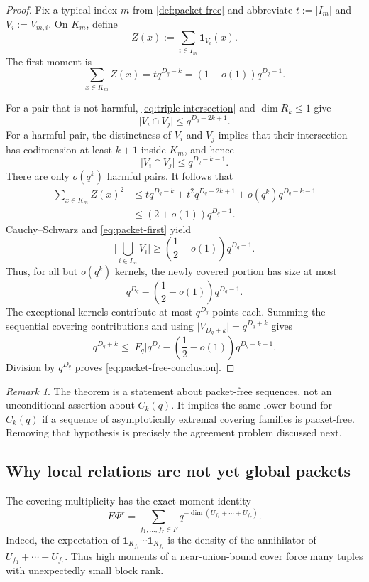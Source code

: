 \documentclass[11pt,reqno]{amsart}
\numberwithin{equation}{section}
\theoremstyle{definition}
\theoremstyle{remark}
\newtheorem{remark}[remark]{Remark}
\newcommand{\E}{\mathbb E}
\newcommand{\one}{\mathbf 1}
\newcommand{\cF}{\mathcal F}
\newcommand{\cR}{\mathcal R}
\newcommand{\abs}[1]{\lvert#1\rvert}
\def\mathbb#1{#1}%
\def\mathcal#1{#1}%
\begin{document}
\begin{proof}
Fix a typical index $m$ from \cref{def:packet-free} and abbreviate
$t:=\abs{I_m}$ and $V_i:=V_{m,i}$.  On $K_m$, define
\[
 Z(x):=\sum_{i\in I_m}\one_{V_i}(x).
\]
The first moment is
\begin{equation}\label{eq:packet-first}
 \sum_{x\in K_m}Z(x)
 =tq^{D_q-k}
 =(1-o(1))q^{D_q-1}.
\end{equation}

For a pair that is not harmful, \eqref{eq:triple-intersection} and
$\dim\cR_k\le1$ give
\[
 \abs{V_i\cap V_j}
 \le q^{D_q-2k+1}.
\]
For a harmful pair, the distinctness of $V_i$ and $V_j$ implies that their intersection has codimension at least $k+1$ inside $K_m$, and hence
\[
 \abs{V_i\cap V_j}
 \le q^{D_q-k-1}.
\]
There are only $o(q^k)$ harmful pairs.  It follows that
\begin{align*}
 \sum_{x\in K_m}Z(x)^2
 &\le tq^{D_q-k}
 +t^2q^{D_q-2k+1}
 +o(q^k)q^{D_q-k-1}\\
 &\le(2+o(1))q^{D_q-1}.
\end{align*}
Cauchy--Schwarz and \eqref{eq:packet-first} yield
\begin{equation}\label{eq:packet-overlap}
 \abs{\bigcup_{i\in I_m}V_i}
 \ge\left(\frac12-o(1)\right)q^{D_q-1}.
\end{equation}
Thus, for all but $o(q^k)$ kernels, the newly covered portion has size at most
\[
 q^{D_q}-
 \left(\frac12-o(1)\right)q^{D_q-1}.
\]
The exceptional kernels contribute at most $q^{D_q}$ points each.  Summing the sequential covering contributions and using
$\abs{V_{D_q+k}}=q^{D_q+k}$ gives
\[
 q^{D_q+k}
 \le
 \abs{\cF_q}q^{D_q}
 -\left(\frac12-o(1)\right)q^{D_q+k-1}.
\]
Division by $q^{D_q}$ proves
\eqref{eq:packet-free-conclusion}.
\end{proof}

\begin{remark}
The theorem is a statement about packet-free sequences, not an unconditional assertion about $C_k(q)$.  It implies the same lower bound for $C_k(q)$ if a sequence of asymptotically extremal covering families is packet-free.  Removing that hypothesis is precisely the agreement problem discussed next.
\end{remark}

\subsection{Why local relations are not yet global packets}

The covering multiplicity has the exact moment identity
\begin{equation}\label{eq:moment-rank}
 \E\Phi^r
 =\sum_{f_1,\ldots,f_r\in\cF}
 q^{-\dim(U_{f_1}+\cdots+U_{f_r})}.
\end{equation}
Indeed, the expectation of
$\one_{K_{f_1}}\cdots\one_{K_{f_r}}$ is the density of the annihilator of
$U_{f_1}+\cdots+U_{f_r}$.  Thus high moments of a near-union-bound cover force many tuples with unexpectedly small block rank.
\end{document}
